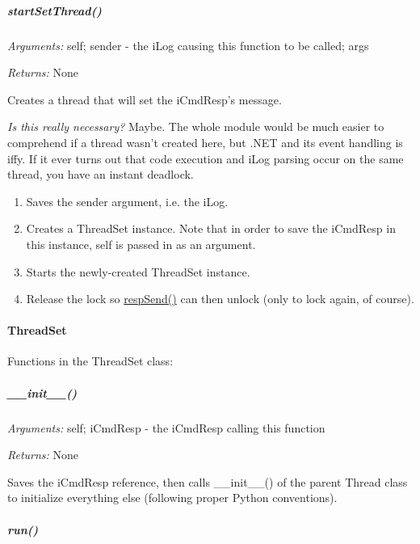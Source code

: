 \documentclass[12pt,letterpaper]{article}
\begin{document}
%
%
\subparagraph{startSetThread()}
\label{4.7.1.0.2}

\emph{Arguments:} self; sender - the iLog causing this function to be called; args

\emph{Returns:} None

Creates a thread that will set the iCmdResp's message.

\emph{Is this really necessary?} Maybe. The whole module would be much easier to comprehend if a thread wasn't created here, but .NET and its event handling is iffy. If it ever turns out that code execution and iLog parsing occur on the same thread, you have an instant deadlock.

\begin{enumerate}

\item Saves the sender argument, i.e. the iLog.

\item Creates a ThreadSet instance. Note that in order to save the iCmdResp in this instance, self is passed in as an argument.

\item Starts the newly-created ThreadSet instance.

\item Release the lock so \hyperref[4.7.1.0.1]{respSend()} can then unlock (only to lock again, of course).

\end{enumerate}



%
%
\paragraph{ThreadSet}
\label{4.7.1.1}

Functions in the ThreadSet class:

\setcounter{subparagraph}{-1}



%
%
\subparagraph{\_\_init\_\_()}
\label{4.7.1.1.0}

\emph{Arguments:} self; iCmdResp - the iCmdResp calling this function

\emph{Returns:} None

Saves the iCmdResp reference, then calls \_\_init\_\_() of the parent Thread class to initialize everything else (following proper Python conventions).



%
%
\subparagraph{run()}
\label{4.7.1.1.1}
\end{document}
